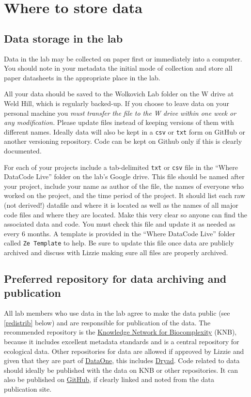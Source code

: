 \documentclass[11pt,a4paper,oneside]{article}
\begin{document}
\section{Where to store data}
\subsection{Data storage in the lab}
\label{labstorage}
Data in the lab may be collected on paper first or immediately into a computer. You should note in your metadata the initial mode of collection and store all paper datasheets in the appropriate place in the lab.

All your data should be saved to the Wolkovich Lab folder on the W drive at Weld Hill, which is regularly backed-up. If you choose to leave data on your personal machine you \emph{must transfer the file to the W drive within one week or any modification.} Please update files instead of keeping versions of them with different names. Ideally data will also be kept in a \verb|csv| or \verb|txt| form on GitHub or another versioning repository. Code can be kept on Github only if this is clearly documented.

For each of your projects include a tab-delimited \verb|txt| or \verb|csv| file in the ``Where DataCode Live'' folder on the lab's Google drive. This file should be named after your project, include your name as author of the file, the names of everyone who worked on the project, and the time period of the project. It should list each raw (not derived!) datafile and where it is located as well as the names of all major code files and where they are located. Make this very clear so anyone can find the associated data and code. You must check this file and update it as needed as every 6 months. A template is provided in the ``Where DataCode Live'' folder called \verb|Ze Template| to help. Be sure to update this file once data are publicly archived and discuss with Lizzie making sure all files are properly archived.

\subsection{Preferred repository for data archiving and publication}
All lab members who use data in the lab agree to make the data public (see \ref{redistrib} below) and are responsible for publication of the data. The recommended repository is the \href{http://knb.ecoinformatics.org/}{Knowledge Network for Biocomplexity} (KNB), because it includes excellent metadata standards and is a central repository for ecological data. Other repositories for data are allowed if approved by Lizzie and given that they are part of \href{https://www.dataone.org/}{DataOne}, this includes \href{http://datadryad.org/}{Dryad}. Code related to data should ideally be published with the data on KNB or other repositories. It can also be published on \href{https://github.com/}{GitHub}, if clearly linked and noted from the data publication site.
\end{document}
